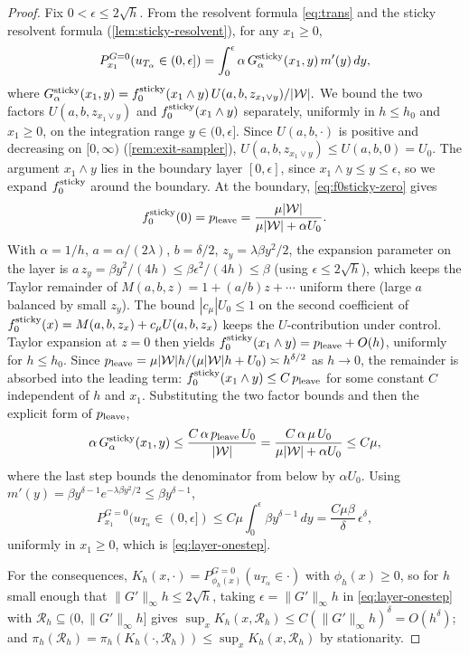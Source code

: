 \documentclass[aap,preprint]{imsart}
\numberwithin{equation}{section}
\theoremstyle{plain}
\theoremstyle{definition}
\begin{document}
\begin{proof}
Fix $0<\epsilon\le2\sqrt h$.  From the resolvent formula \cref{eq:trans} and the sticky resolvent formula (\cref{lem:sticky-resolvent}), for any $x_1\geq 0$,
\[
  P_{x_1}^{G=0}(u_{T_\alpha}\in(0,\epsilon])
  = \int_0^\epsilon \alpha\,G^{\rm sticky}_\alpha(x_1,y)\,m'(y)\,dy,
\]
where \(
  G^{\rm sticky}_\alpha(x_1, y)
   =  {f_0^{\rm sticky}(x_1\wedge y)\,U(a,b,z_{x_1\vee y})}/{|\mathcal{W}|}.
\)
We bound the two factors $U(a,b,z_{x_1\vee y})$ and $f_0^{\rm sticky}(x_1\wedge y)$ separately, uniformly in $h\le h_0$ and $x_1\ge 0$, on the integration range $y\in(0,\epsilon]$.  Since $U(a,b,\cdot)$ is positive and decreasing on $[0,\infty)$ (\cref{rem:exit-sampler}),
\(  U(a,b,z_{x_1\vee y})  \le  U(a,b,0)  =  U_0\).
The argument $x_1\wedge y$ lies in the boundary layer $[0, \epsilon]$, since $x_1\wedge y\le y\le\epsilon$, so we expand $f_0^{\rm sticky}$ around the boundary.  At the boundary, \cref{eq:f0sticky-zero} gives
\[
  f_0^{\rm sticky}(0)  =  p_{\rm leave}  =  \frac{\mu|\mathcal{W}|}{\mu|\mathcal{W}|+\alpha U_0}.
\]
With $\alpha=1/h$, $a = \alpha/(2\lambda)$, $b=\delta/2$, $z_y = \lambda\beta y^2/2$, the expansion parameter on the layer is $a\,z_y = \beta y^2/(4h)\le\beta\epsilon^2/(4h)\le\beta$ (using $\epsilon\le2\sqrt h$), which keeps the Taylor remainder of $M(a,b,z) = 1 + (a/b)z + \cdots$ uniform there (large $a$ balanced by small $z_y$).  The bound $|c_\mu|U_0\le 1$ on the second coefficient of $f_0^{\rm sticky}(x) = M(a,b,z_x) + c_\mu U(a,b,z_x)$ keeps the $U$-contribution under control.  Taylor expansion at $z=0$ then yields
\(  f_0^{\rm sticky}(x_1\wedge y)  =  p_{\rm leave} + O(h)\),
uniformly for $h\le h_0$. Since  $p_{\rm leave} = \mu|\mathcal{W}|h/(\mu|\mathcal{W}|h + U_0) \asymp h^{\delta/2}$ as $h\to 0$, the remainder is absorbed into the leading term:
\(
  f_0^{\rm sticky}(x_1\wedge y)  \le  C\,p_{\rm leave}
\)
for some constant $C$ independent of $h$ and $x_1$.  Substituting the two factor bounds and then the explicit form of $p_{\rm leave}$,
\[
  \alpha\,G^{\rm sticky}_\alpha(x_1,y)
   \le  \frac{C\,\alpha\,p_{\rm leave}\,U_0}{|\mathcal{W}|}
   =  \frac{C\,\alpha\,\mu\,U_0}{\mu|\mathcal{W}|+\alpha U_0}
   \le  C\mu,
\]
where the last step bounds the denominator from below by $\alpha U_0$.
Using $m'(y) = \beta y^{\delta-1}e^{-\lambda\beta y^2/2} \leq \beta y^{\delta-1}$,
\[
  P_{x_1}^{G=0}(u_{T_\alpha}\in(0,\epsilon])
   \leq  C\mu \int_0^\epsilon \beta y^{\delta-1}\,dy
   =  \frac{C\mu\beta}{\delta}\,\epsilon^\delta ,
\]
uniformly in $x_1 \geq 0$, which is \eqref{eq:layer-onestep}.

For the consequences, $K_h(x,\cdot)=P^{G=0}_{\phi_h(x)}(u_{T_\alpha}\in\cdot)$ with $\phi_h(x)\ge0$, so for $h$ small enough that $\|G'\|_\infty h\le2\sqrt h$, taking $\epsilon=\|G'\|_\infty h$ in \eqref{eq:layer-onestep} with $\mathcal{R}_h\subseteq(0,\|G'\|_\infty h]$ gives $\sup_{x}K_h(x,\mathcal{R}_h)\le C(\|G'\|_\infty h)^\delta=O(h^\delta)$; and $\pi_h(\mathcal{R}_h)=\pi_h(K_h(\cdot,\mathcal{R}_h))\le\sup_x K_h(x,\mathcal{R}_h)$ by stationarity.
\end{proof}
\end{document}
